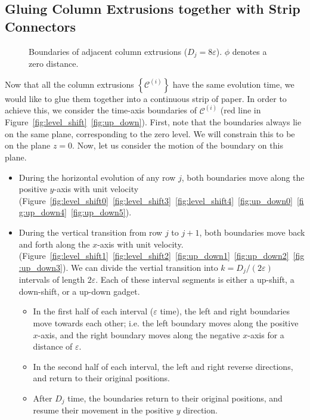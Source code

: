 \subsection{Gluing Column Extrusions together with Strip Connectors}
\label{sec:strip_connectors}

\graphicspath{{./figures/}}
\begin{wrapfigure}[19]{R}{0.35\textwidth}
    \vspace{-2.8em}
    \def\svgwidth{0.35\textwidth}
    \caption{Boundaries of adjacent column extrusions ($D_j = 8\varepsilon$). $\phi$ denotes a zero distance.}
    \label{fig:boundaries}
\end{wrapfigure}

Now that all the column extrusions $\left\{ \mathcal C^{(i)} \right\}$ have the same evolution time,
we would like to glue them together into a continuous strip of paper.
In order to achieve this, we consider the time-axis boundaries of $\mathcal C^{(i)}$ (red line in Figure~\ref{fig:level_shift}~\ref{fig:up_down}).
First, note that the boundaries always lie on the same plane, corresponding to the zero level.
We will constrain this to be on the plane $z=0$. Now, let us consider the motion of the boundary on this plane.\\
\begin{itemize}
    \item During the horizontal evolution of any row $j$, both boundaries move along the positive $y$-axis with unit velocity
          (Figure~\ref{fig:level_shift0}~\ref{fig:level_shift3}~\ref{fig:level_shift4}~\ref{fig:up_down0}~\ref{fig:up_down4}~\ref{fig:up_down5}).
\end{itemize}

\begin{itemize}[resume, before = \vspace*{-\dimexpr\topsep+\partopsep\relax}]
    \item During the vertical transition from row $j$ to $j+1$, both boundaries move back and forth along the $x$-axis with unit velocity.
          (Figure~\ref{fig:level_shift1}~\ref{fig:level_shift2}~\ref{fig:up_down1}~\ref{fig:up_down2}~\ref{fig:up_down3}).
          We can divide the vertial transition into $k = D_j/(2\varepsilon)$ intervals of length $2\varepsilon$.
          Each of these interval segments is either a up-shift, a down-shift, or a up-down gadget.
    \begin{itemize}
        \item In the first half of each interval ($\varepsilon$ time), the left and right boundaries move towards each other;
              i.e. the left boundary moves along the positive $x$-axis,
              and the right boundary moves along the negative $x$-axis for a distance of $\varepsilon$.
        \item In the second half of each interval, the left and right reverse directions, and return to their original positions.
        \item After $D_j$ time, the boundaries return to their original positions, and resume their movement in the positive $y$ direction.
    \end{itemize}
\end{itemize}

